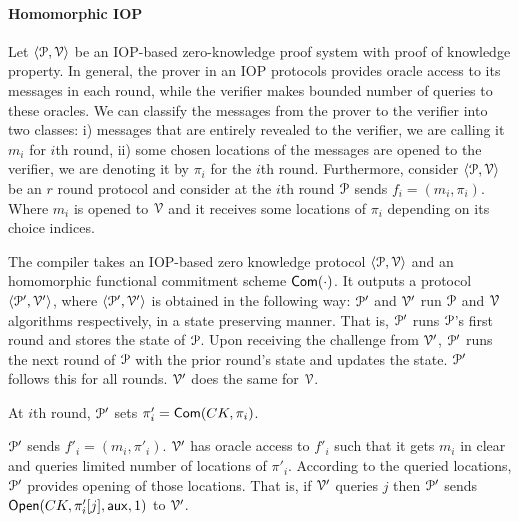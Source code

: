 \paragraph*{Homomorphic IOP} Let $\langle \mathcal{P},\mathcal{V}\rangle$ be an IOP-based zero-knowledge proof system with proof of knowledge property. In general, the prover in an IOP protocols provides oracle access to its messages in each round, while the verifier makes bounded number of queries to these oracles. We can classify the messages from the prover to the verifier into two classes: i) messages that are entirely revealed to the verifier, we are calling it $m_i$ for $i$th round, ii) some chosen locations of the messages are opened to the verifier, we are denoting it by $\pi_i$ for the $i$th round.
Furthermore, consider $\langle \mathcal{P},\mathcal{V}\rangle$ be an $r$ round protocol and consider at the $i$th round $\mathcal{P}$ sends $f_i = (m_i, \pi_i)$. Where $m_i$ is opened to $\mathcal{V}$ and it receives some locations of $\pi_i$ depending on its choice indices. 

The compiler takes an IOP-based zero knowledge protocol $\langle \mathcal{P},\mathcal{V}\rangle$ and an homomorphic functional commitment scheme $\mathsf{Com}(\cdot)$. It outputs a protocol $\langle \mathcal{P}',\mathcal{V}'\rangle$, where $\langle \mathcal{P}',\mathcal{V}'\rangle$ is obtained in the following way: $\mathcal{P}'$ and $\mathcal{V}'$ run $\mathcal{P}$ and $\mathcal{V}$ algorithms respectively, in a state preserving manner. That is, $\mathcal{P}'$ runs $\mathcal{P}$'s first round and stores the state of $\mathcal{P}$. Upon receiving the challenge from $\mathcal{V}'$, $\mathcal{P}'$ runs the next round of $\mathcal{P}$ with the prior round's state and updates the state. $\mathcal{P}'$ follows this for all rounds. $\mathcal{V}'$ does the same for $\mathcal{V}$. 
 
At $i$th round, $\mathcal{P}'$ sets $\pi'_i = \mathsf{Com}(CK,\pi_i)$.

$\mathcal{P}'$ sends $f'_i = (m_i, \pi'_i)$. $\mathcal{V}'$ has oracle access to $f'_i$ such that it gets $m_i$ in clear and queries limited number of locations of $\pi'_i$. According to the queried locations, $\mathcal{P}'$ provides opening of those locations. That is, if $\mathcal{V}'$ queries $j$ then $\mathcal{P}'$ sends $\mathsf{Open}(CK, \pi'_i[j], \mathsf{aux}, 1)$ to $\mathcal{V}'$.

